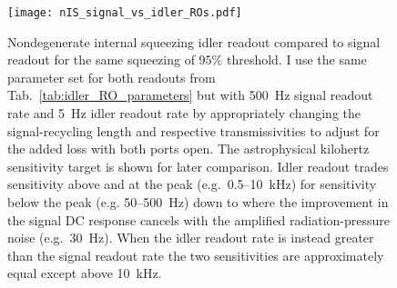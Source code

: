 \begin{figure}[ht]
    \centering
    \texttt{[image: nIS\_signal\_vs\_idler\_ROs.pdf]}
    \caption{ Nondegenerate internal squeezing idler readout compared to signal readout for the same squeezing of $95\%$ threshold. I use the same parameter set for both readouts from Tab.~\ref{tab:idler_RO_parameters} but with 500~Hz signal readout rate and 5~Hz idler readout rate by appropriately changing the signal-recycling length and respective transmissivities to adjust for the added loss with both ports open. The astrophysical kilohertz sensitivity target is shown for later comparison. Idler readout trades sensitivity above and at the peak (e.g.\ 0.5--10~kHz) for sensitivity below the peak (e.g. 50--500~Hz) down to where the improvement in the signal DC response cancels with the amplified radiation-pressure noise (e.g.\ 30~Hz). When the idler readout rate is instead greater than the signal readout rate the two sensitivities are approximately equal except above 10~kHz. %
    }
    \label{fig:nIS_signal_vs_idler_ROs}
\end{figure}

